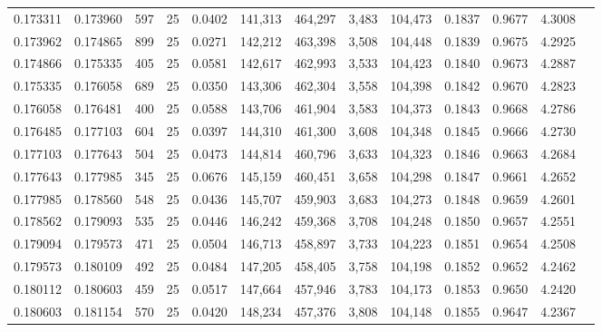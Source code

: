 \begin{tabular}{rrrrrrrrrrrrr}
0.173311 & 0.173960 &   597 &  25 &                                     0.0402 & 141,313 & 464,297 &   3,483 & 104,473 & 0.1837 & 0.9677 & 4.3008 \\
0.173962 & 0.174865 &   899 &  25 &                                     0.0271 & 142,212 & 463,398 &   3,508 & 104,448 & 0.1839 & 0.9675 & 4.2925 \\
0.174866 & 0.175335 &   405 &  25 &                                     0.0581 & 142,617 & 462,993 &   3,533 & 104,423 & 0.1840 & 0.9673 & 4.2887 \\
0.175335 & 0.176058 &   689 &  25 &                                     0.0350 & 143,306 & 462,304 &   3,558 & 104,398 & 0.1842 & 0.9670 & 4.2823 \\
0.176058 & 0.176481 &   400 &  25 &                                     0.0588 & 143,706 & 461,904 &   3,583 & 104,373 & 0.1843 & 0.9668 & 4.2786 \\
0.176485 & 0.177103 &   604 &  25 &                                     0.0397 & 144,310 & 461,300 &   3,608 & 104,348 & 0.1845 & 0.9666 & 4.2730 \\
0.177103 & 0.177643 &   504 &  25 &                                     0.0473 & 144,814 & 460,796 &   3,633 & 104,323 & 0.1846 & 0.9663 & 4.2684 \\
0.177643 & 0.177985 &   345 &  25 &                                     0.0676 & 145,159 & 460,451 &   3,658 & 104,298 & 0.1847 & 0.9661 & 4.2652 \\
0.177985 & 0.178560 &   548 &  25 &                                     0.0436 & 145,707 & 459,903 &   3,683 & 104,273 & 0.1848 & 0.9659 & 4.2601 \\
0.178562 & 0.179093 &   535 &  25 &                                     0.0446 & 146,242 & 459,368 &   3,708 & 104,248 & 0.1850 & 0.9657 & 4.2551 \\
0.179094 & 0.179573 &   471 &  25 &                                     0.0504 & 146,713 & 458,897 &   3,733 & 104,223 & 0.1851 & 0.9654 & 4.2508 \\
0.179573 & 0.180109 &   492 &  25 &                                     0.0484 & 147,205 & 458,405 &   3,758 & 104,198 & 0.1852 & 0.9652 & 4.2462 \\
0.180112 & 0.180603 &   459 &  25 &                                     0.0517 & 147,664 & 457,946 &   3,783 & 104,173 & 0.1853 & 0.9650 & 4.2420 \\
0.180603 & 0.181154 &   570 &  25 &                                     0.0420 & 148,234 & 457,376 &   3,808 & 104,148 & 0.1855 & 0.9647 & 4.2367 \\

\end{tabular}
